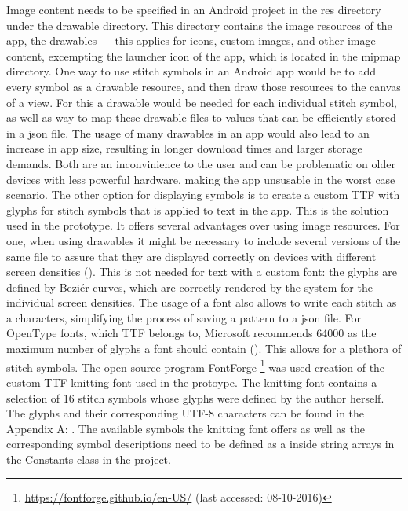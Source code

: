 Image content needs to be specified in an Android project in the res directory under the drawable directory. This directory contains the image resources of the app, the drawables --- this applies for icons, custom images, and other image content, excempting the launcher icon of the app, which is located in the mipmap directory. One way to use stitch symbols in an Android app would be to add every symbol as a drawable resource, and then draw those resources to the canvas of a view. For this a drawable would be needed for each individual stitch symbol, as well as way to map these drawable files to values that can be efficiently stored in a \gls{json} file. The usage of many drawables in an app would also lead to an increase in app size, resulting in longer download times and larger storage demands. Both are an inconvinience to the user and can be problematic on older devices with less powerful hardware, making the app unsusable in the worst case scenario.
The other option for displaying symbols is to create a custom \gls{TTF} with glyphs for stitch symbols that is applied to text in the app. This is the solution used in the prototype. It offers several advantages over using image resources. For one, when using drawables it might be necessary to include several versions of the same file to assure that they are displayed correctly on devices with different screen densities (\cite{android_densities}). This is not needed for text with a custom font: the glyphs are defined by Beziér curves, which are correctly rendered by the system for the individual screen densities.  The usage of a font also allows to write each stitch as a characters, simplifying the process of saving a pattern to a \gls{json} file. For OpenType fonts, which \gls{TTF} belongs to, Microsoft recommends 64000 as the maximum number of glyphs a font should contain (\cite{microsoft_max_glyphs}). This allows for a plethora of stitch symbols. The open source program FontForge \footnote{\url{https://fontforge.github.io/en-US/} (last accessed: 08-10-2016)} was used creation of the custom \gls{TTF} knitting font used in the protoype. The knitting font contains a selection of 16 stitch symbols whose glyphs were defined by the author herself. The glyphs and their corresponding UTF-8 characters can be found in the Appendix A: . The available symbols the knitting font offers as well as the corresponding symbol descriptions need to be defined as a inside string arrays in the Constants class in the project.

